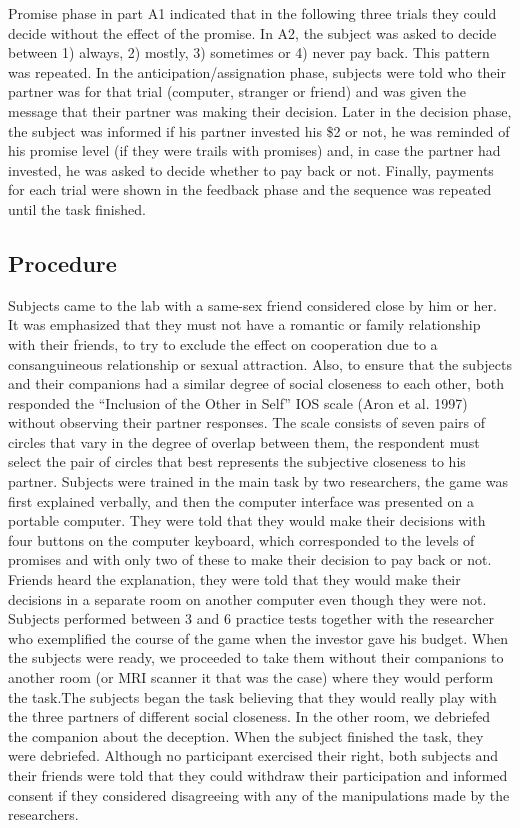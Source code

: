 \documentclass[smallextended]{svjour3}       %
\begin{document}
Promise phase in part A1 indicated that in the following three trials
they could decide without the effect of the promise. In A2, the subject
was asked to decide between 1) always, 2) mostly, 3) sometimes or 4)
never pay back. This pattern was repeated. In the
anticipation/assignation phase, subjects were told who their partner was
for that trial (computer, stranger or friend) and was given the message
that their partner was making their decision. Later in the decision
phase, the subject was informed if his partner invested his \$2 or not,
he was reminded of his promise level (if they were trails with promises)
and, in case the partner had invested, he was asked to decide whether to
pay back or not. Finally, payments for each trial were shown in the
feedback phase and the sequence was repeated until the task finished.

\hypertarget{procedure}{%
\subsection{Procedure}\label{procedure}}

Subjects came to the lab with a same-sex friend considered close by him
or her. It was emphasized that they must not have a romantic or family
relationship with their friends, to try to exclude the effect on
cooperation due to a consanguineous relationship or sexual attraction.
Also, to ensure that the subjects and their companions had a similar
degree of social closeness to each other, both responded the ``Inclusion
of the Other in Self'' IOS scale (Aron et al. 1997) without observing
their partner responses. The scale consists of seven pairs of circles
that vary in the degree of overlap between them, the respondent must
select the pair of circles that best represents the subjective closeness
to his partner. Subjects were trained in the main task by two
researchers, the game was first explained verbally, and then the
computer interface was presented on a portable computer. They were told
that they would make their decisions with four buttons on the computer
keyboard, which corresponded to the levels of promises and with only two
of these to make their decision to pay back or not. Friends heard the
explanation, they were told that they would make their decisions in a
separate room on another computer even though they were not. Subjects
performed between 3 and 6 practice tests together with the researcher
who exemplified the course of the game when the investor gave his
budget. When the subjects were ready, we proceeded to take them without
their companions to another room (or MRI scanner it that was the case)
where they would perform the task.The subjects began the task believing
that they would really play with the three partners of different social
closeness. In the other room, we debriefed the companion about the
deception. When the subject finished the task, they were debriefed.
Although no participant exercised their right, both subjects and their
friends were told that they could withdraw their participation and
informed consent if they considered disagreeing with any of the
manipulations made by the researchers.
\end{document}
